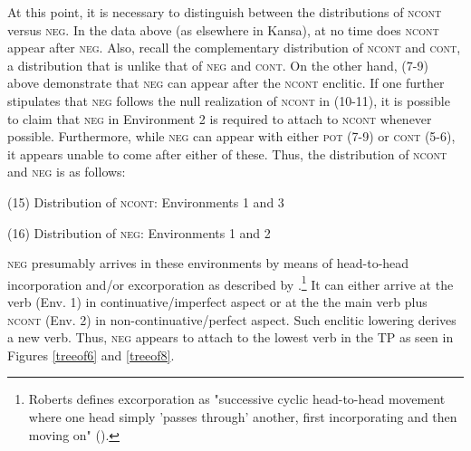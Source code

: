 \documentclass[output=paper]{LSP/langsci}
\begin{document}
\vspace{1em}
At this point, it is necessary to distinguish between the distributions of \textsc{ncont} versus \textsc{neg}. In the data above (as elsewhere in Kansa), at no time does \textsc{ncont} appear after \textsc{neg}. Also, recall the complementary distribution of \textsc{ncont} and \textsc{cont}, a distribution that is unlike that of \textsc{neg} and \textsc{cont}. On the other hand, (7-9) above demonstrate that \textsc{neg} can appear after the \textsc{ncont} enclitic. If one further stipulates that \textsc{neg} follows the null realization of \textsc{ncont} in (10-11), it is possible to claim that \textsc{neg} in Environment 2 is required to attach to \textsc{ncont} whenever possible. Furthermore, while \textsc{neg} can appear with either \textsc{pot} (7-9) or \textsc{cont} (5-6), it appears unable to come after either of these. Thus, the distribution of \textsc{ncont} and \textsc{neg} is as follows:

\vspace{1em}
(15)	Distribution of \textsc{ncont}:	Environments 1 and 3

\vspace{1em}
(16)	Distribution of \textsc{neg}:	Environments 1 and 2

\vspace{1em}
\textsc{neg} presumably arrives in these environments by means of head-to-head incorporation and/or excorporation as described by \citet{Roberts1991}.\footnote{Roberts defines excorporation as "successive cyclic head-to-head movement where one head simply 'passes through' another, first incorporating and then moving on" (\citeyear[211]{Roberts1991}).} It can either arrive at the verb (Env. 1) in continuative/imperfect aspect or at the the main verb plus \textsc{ncont} (Env. 2) in non-continuative/perfect aspect. Such enclitic lowering derives a new verb. Thus, \textsc{neg} appears to attach to the lowest verb in the TP as seen in Figures \ref{treeof6} and \ref{treeof8}.
\end{document}

